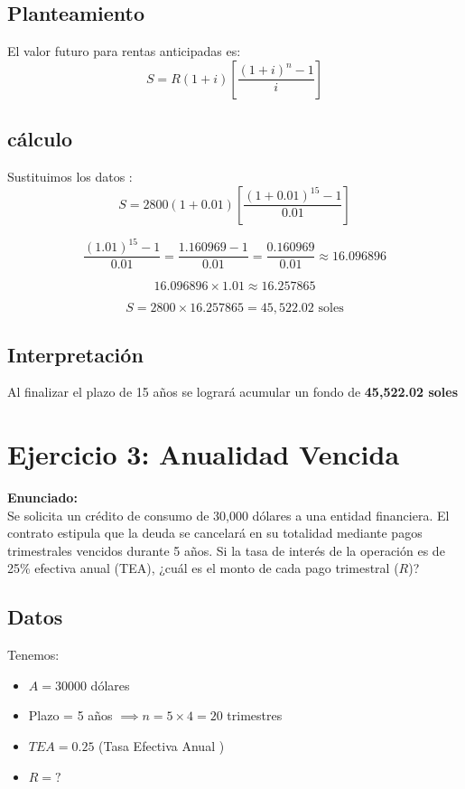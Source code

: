\documentclass[12pt,a4paper]{article}
\begin{document}
	\subsection*{Planteamiento}
	El valor futuro para rentas anticipadas es:
	$$S = R (1 + i) \left[ \frac{(1 + i)^n - 1}{i} \right]$$
	
	\subsection*{cálculo }
	Sustituimos los datos :
	$$S = 2800 (1 + 0.01) \left[ \frac{(1 + 0.01)^{15} - 1}{0.01} \right]$$
	
	$$\frac{(1.01)^{15} - 1}{0.01} = \frac{1.160969 - 1}{0.01} = \frac{0.160969}{0.01} \approx 16.096896$$
	
	$$16.096896 \times 1.01 \approx 16.257865$$
	
	$$S = 2800 \times 16.257865 = 45,522.02 \text{ soles}$$
	
	\subsection*{Interpretación}
	Al finalizar el plazo de 15 años se logrará acumular un fondo de \textbf{45,522.02 soles}
	\newpage
	\section*{Ejercicio 3: Anualidad Vencida}
	
	\textbf{Enunciado:} \\
	Se solicita un crédito de consumo de 30,000 dólares a una entidad financiera. El contrato estipula que la deuda se cancelará en su totalidad mediante pagos trimestrales vencidos durante 5 años. Si la tasa de interés de la operación es de 25\% efectiva anual (TEA), ¿cuál es el monto de cada pago trimestral ($R$)?
	
	\subsection*{Datos }
	Tenemos:
	\begin{itemize}
		\item $A = 30000$ dólares 
		\item Plazo = 5 años $\implies n = 5 \times 4 = 20$ trimestres 
		\item $TEA = 0.25$ (Tasa Efectiva Anual )
		\item $R = \text{?}$ 
	\end{itemize}
	
\end{document}
